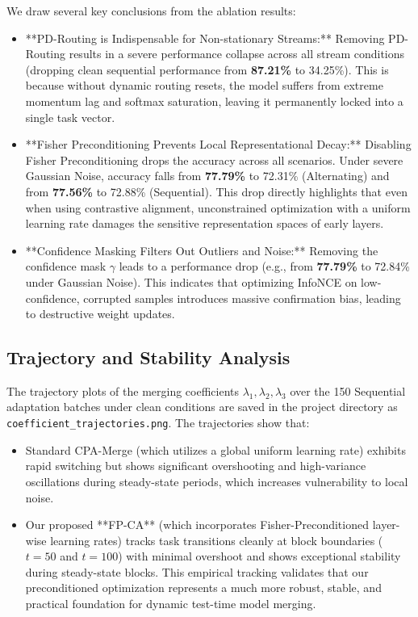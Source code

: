 \documentclass{article}
\theoremstyle{plain}
\theoremstyle{definition}
\theoremstyle{remark}
\begin{document}
We draw several key conclusions from the ablation results:
\begin{itemize}
  \item **PD-Routing is Indispensable for Non-stationary Streams:** Removing PD-Routing results in a severe performance collapse across all stream conditions (dropping clean sequential performance from \textbf{87.21\%} to 34.25\%). This is because without dynamic routing resets, the model suffers from extreme momentum lag and softmax saturation, leaving it permanently locked into a single task vector.
  \item **Fisher Preconditioning Prevents Local Representational Decay:** Disabling Fisher Preconditioning drops the accuracy across all scenarios. Under severe Gaussian Noise, accuracy falls from \textbf{77.79\%} to 72.31\% (Alternating) and from \textbf{77.56\%} to 72.88\% (Sequential). This drop directly highlights that even when using contrastive alignment, unconstrained optimization with a uniform learning rate damages the sensitive representation spaces of early layers.
  \item **Confidence Masking Filters Out Outliers and Noise:** Removing the confidence mask $\gamma$ leads to a performance drop (e.g., from \textbf{77.79\%} to 72.84\% under Gaussian Noise). This indicates that optimizing InfoNCE on low-confidence, corrupted samples introduces massive confirmation bias, leading to destructive weight updates.
\end{itemize}

\subsection{Trajectory and Stability Analysis}
The trajectory plots of the merging coefficients $\lambda_1, \lambda_2, \lambda_3$ over the 150 Sequential adaptation batches under clean conditions are saved in the project directory as \texttt{coefficient\_trajectories.png}. The trajectories show that:
\begin{itemize}
  \item Standard CPA-Merge (which utilizes a global uniform learning rate) exhibits rapid switching but shows significant overshooting and high-variance oscillations during steady-state periods, which increases vulnerability to local noise.
  \item Our proposed **FP-CA** (which incorporates Fisher-Preconditioned layer-wise learning rates) tracks task transitions cleanly at block boundaries ($t=50$ and $t=100$) with minimal overshoot and shows exceptional stability during steady-state blocks. This empirical tracking validates that our preconditioned optimization represents a much more robust, stable, and practical foundation for dynamic test-time model merging.
\end{itemize}
\end{document}
